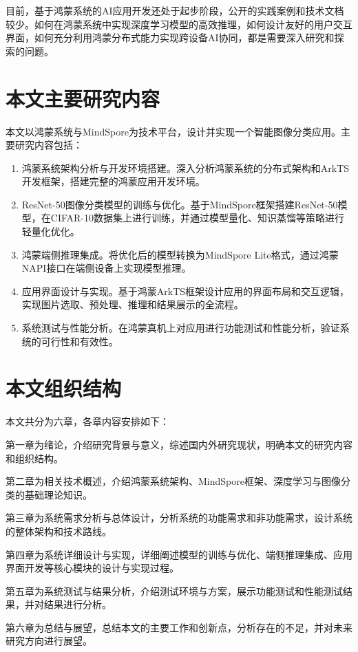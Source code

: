 目前，基于鸿蒙系统的AI应用开发还处于起步阶段，公开的实践案例和技术文档较少。如何在鸿蒙系统中实现深度学习模型的高效推理，如何设计友好的用户交互界面，如何充分利用鸿蒙分布式能力实现跨设备AI协同，都是需要深入研究和探索的问题。

\section{本文主要研究内容}

本文以鸿蒙系统与MindSpore为技术平台，设计并实现一个智能图像分类应用。主要研究内容包括：

\begin{enumerate}
	\item 鸿蒙系统架构分析与开发环境搭建。深入分析鸿蒙系统的分布式架构和ArkTS开发框架，搭建完整的鸿蒙应用开发环境。
	\item ResNet-50图像分类模型的训练与优化。基于MindSpore框架搭建ResNet-50模型，在CIFAR-10数据集上进行训练，并通过模型量化、知识蒸馏等策略进行轻量化优化。
	\item 鸿蒙端侧推理集成。将优化后的模型转换为MindSpore Lite格式，通过鸿蒙NAPI接口在端侧设备上实现模型推理。
	\item 应用界面设计与实现。基于鸿蒙ArkTS框架设计应用的界面布局和交互逻辑，实现图片选取、预处理、推理和结果展示的全流程。
	\item 系统测试与性能分析。在鸿蒙真机上对应用进行功能测试和性能分析，验证系统的可行性和有效性。
\end{enumerate}

\section{本文组织结构}

本文共分为六章，各章内容安排如下：

第一章为绪论，介绍研究背景与意义，综述国内外研究现状，明确本文的研究内容和组织结构。

第二章为相关技术概述，介绍鸿蒙系统架构、MindSpore框架、深度学习与图像分类的基础理论知识。

第三章为系统需求分析与总体设计，分析系统的功能需求和非功能需求，设计系统的整体架构和技术路线。

第四章为系统详细设计与实现，详细阐述模型的训练与优化、端侧推理集成、应用界面开发等核心模块的设计与实现过程。

第五章为系统测试与结果分析，介绍测试环境与方案，展示功能测试和性能测试结果，并对结果进行分析。

第六章为总结与展望，总结本文的主要工作和创新点，分析存在的不足，并对未来研究方向进行展望。